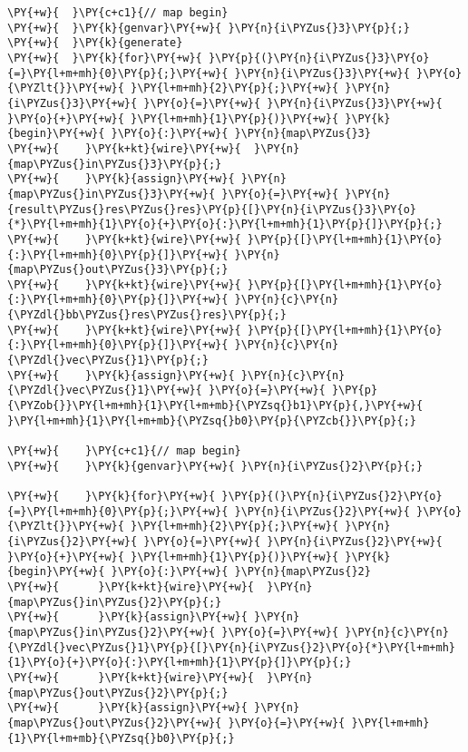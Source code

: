 {\begin{Verbatim}[commandchars=\\\{\}]
\PY{+w}{  }\PY{c+c1}{// map begin}
\PY{+w}{  }\PY{k}{genvar}\PY{+w}{ }\PY{n}{i\PYZus{}3}\PY{p}{;}
\PY{+w}{  }\PY{k}{generate}
\PY{+w}{  }\PY{k}{for}\PY{+w}{ }\PY{p}{(}\PY{n}{i\PYZus{}3}\PY{o}{=}\PY{l+m+mh}{0}\PY{p}{;}\PY{+w}{ }\PY{n}{i\PYZus{}3}\PY{+w}{ }\PY{o}{\PYZlt{}}\PY{+w}{ }\PY{l+m+mh}{2}\PY{p}{;}\PY{+w}{ }\PY{n}{i\PYZus{}3}\PY{+w}{ }\PY{o}{=}\PY{+w}{ }\PY{n}{i\PYZus{}3}\PY{+w}{ }\PY{o}{+}\PY{+w}{ }\PY{l+m+mh}{1}\PY{p}{)}\PY{+w}{ }\PY{k}{begin}\PY{+w}{ }\PY{o}{:}\PY{+w}{ }\PY{n}{map\PYZus{}3}
\PY{+w}{    }\PY{k+kt}{wire}\PY{+w}{  }\PY{n}{map\PYZus{}in\PYZus{}3}\PY{p}{;}
\PY{+w}{    }\PY{k}{assign}\PY{+w}{ }\PY{n}{map\PYZus{}in\PYZus{}3}\PY{+w}{ }\PY{o}{=}\PY{+w}{ }\PY{n}{result\PYZus{}res\PYZus{}res}\PY{p}{[}\PY{n}{i\PYZus{}3}\PY{o}{*}\PY{l+m+mh}{1}\PY{o}{+}\PY{o}{:}\PY{l+m+mh}{1}\PY{p}{]}\PY{p}{;}
\PY{+w}{    }\PY{k+kt}{wire}\PY{+w}{ }\PY{p}{[}\PY{l+m+mh}{1}\PY{o}{:}\PY{l+m+mh}{0}\PY{p}{]}\PY{+w}{ }\PY{n}{map\PYZus{}out\PYZus{}3}\PY{p}{;}
\PY{+w}{    }\PY{k+kt}{wire}\PY{+w}{ }\PY{p}{[}\PY{l+m+mh}{1}\PY{o}{:}\PY{l+m+mh}{0}\PY{p}{]}\PY{+w}{ }\PY{n}{c}\PY{n}{\PYZdl{}bb\PYZus{}res\PYZus{}res}\PY{p}{;}
\PY{+w}{    }\PY{k+kt}{wire}\PY{+w}{ }\PY{p}{[}\PY{l+m+mh}{1}\PY{o}{:}\PY{l+m+mh}{0}\PY{p}{]}\PY{+w}{ }\PY{n}{c}\PY{n}{\PYZdl{}vec\PYZus{}1}\PY{p}{;}
\PY{+w}{    }\PY{k}{assign}\PY{+w}{ }\PY{n}{c}\PY{n}{\PYZdl{}vec\PYZus{}1}\PY{+w}{ }\PY{o}{=}\PY{+w}{ }\PY{p}{\PYZob{}}\PY{l+m+mh}{1}\PY{l+m+mb}{\PYZsq{}b1}\PY{p}{,}\PY{+w}{   }\PY{l+m+mh}{1}\PY{l+m+mb}{\PYZsq{}b0}\PY{p}{\PYZcb{}}\PY{p}{;}

\PY{+w}{    }\PY{c+c1}{// map begin}
\PY{+w}{    }\PY{k}{genvar}\PY{+w}{ }\PY{n}{i\PYZus{}2}\PY{p}{;}

\PY{+w}{    }\PY{k}{for}\PY{+w}{ }\PY{p}{(}\PY{n}{i\PYZus{}2}\PY{o}{=}\PY{l+m+mh}{0}\PY{p}{;}\PY{+w}{ }\PY{n}{i\PYZus{}2}\PY{+w}{ }\PY{o}{\PYZlt{}}\PY{+w}{ }\PY{l+m+mh}{2}\PY{p}{;}\PY{+w}{ }\PY{n}{i\PYZus{}2}\PY{+w}{ }\PY{o}{=}\PY{+w}{ }\PY{n}{i\PYZus{}2}\PY{+w}{ }\PY{o}{+}\PY{+w}{ }\PY{l+m+mh}{1}\PY{p}{)}\PY{+w}{ }\PY{k}{begin}\PY{+w}{ }\PY{o}{:}\PY{+w}{ }\PY{n}{map\PYZus{}2}
\PY{+w}{      }\PY{k+kt}{wire}\PY{+w}{  }\PY{n}{map\PYZus{}in\PYZus{}2}\PY{p}{;}
\PY{+w}{      }\PY{k}{assign}\PY{+w}{ }\PY{n}{map\PYZus{}in\PYZus{}2}\PY{+w}{ }\PY{o}{=}\PY{+w}{ }\PY{n}{c}\PY{n}{\PYZdl{}vec\PYZus{}1}\PY{p}{[}\PY{n}{i\PYZus{}2}\PY{o}{*}\PY{l+m+mh}{1}\PY{o}{+}\PY{o}{:}\PY{l+m+mh}{1}\PY{p}{]}\PY{p}{;}
\PY{+w}{      }\PY{k+kt}{wire}\PY{+w}{  }\PY{n}{map\PYZus{}out\PYZus{}2}\PY{p}{;}
\PY{+w}{      }\PY{k}{assign}\PY{+w}{ }\PY{n}{map\PYZus{}out\PYZus{}2}\PY{+w}{ }\PY{o}{=}\PY{+w}{ }\PY{l+m+mh}{1}\PY{l+m+mb}{\PYZsq{}b0}\PY{p}{;}



\end{Verbatim}}
